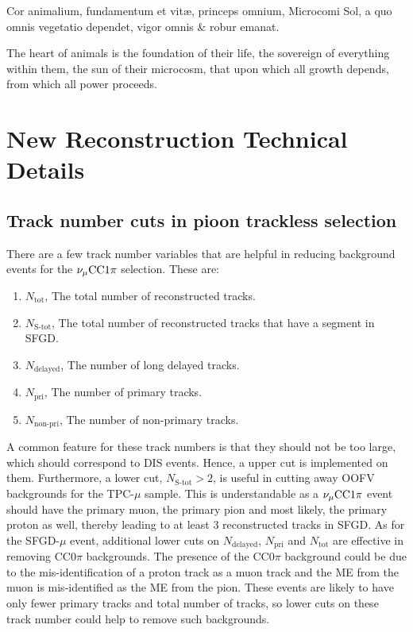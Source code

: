  \begin{savequote}[8cm]
\textlatin{Cor animalium, fundamentum e\longs t vitæ, princeps omnium, Microco\longs mi Sol, a quo omnis vegetatio dependet, vigor omnis \& robur emanat.}

The heart of animals is the foundation of their life, the sovereign of everything within them, the sun of their microcosm, that upon which all growth depends, from which all power proceeds.
\end{savequote}

\chapter{\label{app:newtech}New Reconstruction Technical Details}

\minitoc

\section{Track number cuts in pioon trackless selection}
\label{sec:app-tlpi-trknumcut}
There are a few track number variables that are helpful in reducing background events for the $\nu_{\mu}\textrm{CC}1\pi$ selection. 
These are:
\begin{enumerate}
    \item $N_{\textrm{tot}}$, The total number of reconstructed tracks.
    \item $N_{\textrm{S-tot}}$, The total number of reconstructed tracks that have a segment in SFGD.
    \item $N_{\textrm{delayed}}$, The number of long delayed tracks.
    \item $N_{\textrm{pri}}$, The number of primary tracks.
    \item $N_{\textrm{non-pri}}$, The number of non-primary tracks.
\end{enumerate}
A common feature for these track numbers is that they should not be too large, which should correspond to DIS events.
Hence, a upper cut is implemented on them.
Furthermore, a lower cut, $N_{\textrm{S-tot}}>2$, is useful in cutting away OOFV backgrounds for the TPC-$\mu$ sample.
This is understandable as a $\nu_{\mu}\textrm{CC}1\pi$ event should have the primary muon, the primary pion and most likely, the primary proton as well, thereby leading to at least $3$ reconstructed tracks in SFGD.
As for the SFGD-$\mu$ event, additional lower cuts on  $N_{\textrm{delayed}}$, $N_{\textrm{pri}}$ and $N_{\textrm{tot}}$ are effective in removing CC$0\pi$ backgrounds.
The presence of the CC$0\pi$ background could be due to the mis-identification of a proton track as a muon track and the ME from the muon is mis-identified as the ME from the pion.
These events are likely to have only fewer primary tracks and total number of tracks, so lower cuts on these track number could help to remove such backgrounds.
